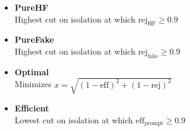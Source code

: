 \documentclass{cmspaper}
\begin{document}
\begin{itemize}
\item {\bf PureHF} \\
Highest cut on isolation at which $\textrm{rej}_{\textrm{HF}} \geq 0.9$
\item {\bf PureFake} \\
Highest cut on isolation at which $\textrm{rej}_{\textrm{fake}} \geq 0.9$
\item {\bf Optimal}\\
Minimizes $x = \sqrt{(1 - \textrm{eff})^2 + (1 - \textrm{rej})^2}$
\item {\bf Efficient} \\
Lowest cut on isolation at which $\textrm{eff}_{\textrm{prompt}} \geq 0.9$
\end{itemize}
\end{document}
